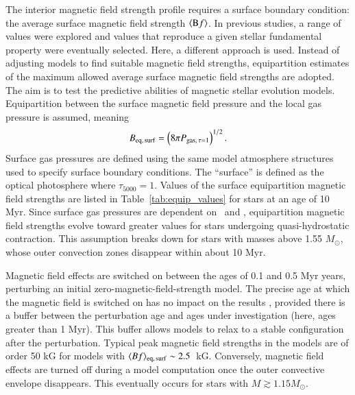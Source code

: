 \documentclass{aa}
\begin{document}
The interior magnetic field strength profile requires a surface boundary condition: the average surface magnetic field strength $\langle{\rm B}f\rangle$. In previous studies, a range of values were explored and values that reproduce a given stellar fundamental property were eventually selected. 
Here, a different approach is used. Instead of adjusting models to find suitable magnetic field strengths, equipartition estimates of the maximum allowed average surface magnetic field strengths are adopted. The aim is to test the predictive abilities of magnetic stellar evolution models. Equipartition between the surface magnetic field pressure and the local gas pressure is assumed, meaning
\begin{equation}
    B_{\rm eq,\, surf} = \left(8\pi P_{{\rm gas},\, \tau = 1}\right)^{1/2}.
\end{equation}
Surface gas pressures are defined using the same model atmosphere structures used to specify surface boundary conditions. The ``surface'' is defined as the optical photosphere where $\tau_{5000} = 1$. Values of the surface equipartition magnetic field strengths are listed in Table~\ref{tab:equip_values} for stars at an age of 10 Myr. Since surface gas pressures are dependent on \logg\ and \teff, equipartition magnetic field strengths evolve toward greater values for stars undergoing quasi-hydrostatic contraction. This assumption breaks down for stars with masses above 1.55 $M_{\odot}$, whose outer convection zones disappear within about 10 Myr.

Magnetic field effects are switched on between the ages of 0.1 and 0.5 Myr years, perturbing an initial zero-magnetic-field-strength model. The precise age at which the magnetic field is switched on has no impact on the results \citep{FC12b}, provided there is a buffer between the perturbation age and ages under investigation (here, ages greater than 1 Myr). This buffer allows models to relax to a stable configuration after the perturbation. Typical peak magnetic field strengths in the models are of order 50 kG for models with $\langle Bf \rangle_{\rm eq,\,surf} \sim 2.5$~kG. Conversely, magnetic field effects are turned off during a model computation once the outer convective envelope disappears. This eventually occurs for stars with $M \gtrsim 1.15 M_{\odot}$.
\end{document}
